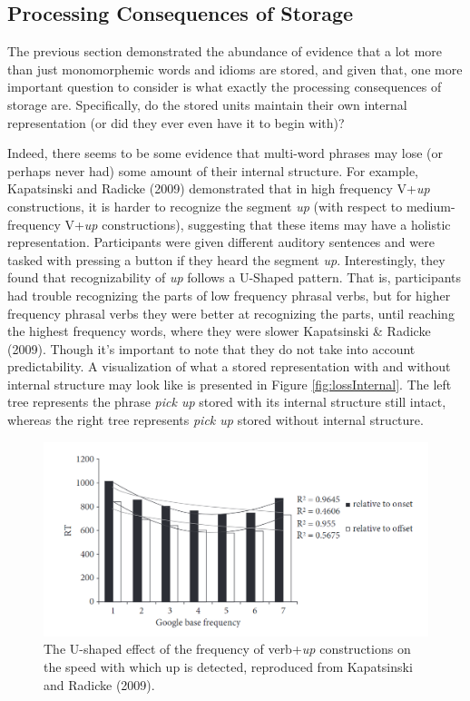 \documentclass[
  man,floatsintext]{apa6}
\begin{document}
\subsection{Processing Consequences of Storage}\label{processing-consequences-of-storage}

The previous section demonstrated the abundance of evidence that a lot more than just monomorphemic words and idioms are stored, and given that, one more important question to consider is what exactly the processing consequences of storage are. Specifically, do the stored units maintain their own internal representation (or did they ever even have it to begin with)?

Indeed, there seems to be some evidence that multi-word phrases may lose (or perhaps never had) some amount of their internal structure. For example, Kapatsinski and Radicke (2009) demonstrated that in high frequency V+\emph{up} constructions, it is harder to recognize the segment \emph{up} (with respect to medium-frequency V+\emph{up} constructions), suggesting that these items may have a holistic representation. Participants were given different auditory sentences and were tasked with pressing a button if they heard the segment \emph{up}. Interestingly, they found that recognizability of \emph{up} follows a U-Shaped pattern. That is, participants had trouble recognizing the parts of low frequency phrasal verbs, but for higher frequency phrasal verbs they were better at recognizing the parts, until reaching the highest frequency words, where they were slower Kapatsinski \& Radicke (2009). Though it's important to note that they do not take into account predictability. A visualization of what a stored representation with and without internal structure may look like is presented in Figure \ref{fig:lossInternal}. The left tree represents the phrase \emph{pick up} stored with its internal structure still intact, whereas the right tree represents \emph{pick up} stored without internal structure.



\begin{figure}

{\centering \includegraphics[width=0.7\linewidth]{Figures/kapatsinskiradicke_graph} 

}

\caption{The U-shaped effect of the frequency of verb+\emph{up} constructions on the speed with which up is detected, reproduced from Kapatsinski and Radicke (2009).}\label{fig:kapatsinskiplot}
\end{figure}
\end{document}
